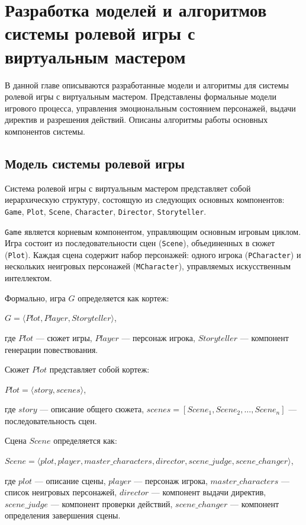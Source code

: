 \chapter{Разработка моделей и алгоритмов системы ролевой игры с виртуальным мастером}

В данной главе описываются разработанные модели и алгоритмы для системы ролевой игры с виртуальным мастером. Представлены формальные модели игрового процесса, управления эмоциональным состоянием персонажей, выдачи директив и разрешения действий. Описаны алгоритмы работы основных компонентов системы.




\section{Модель системы ролевой игры}

Система ролевой игры с виртуальным мастером представляет собой иерархическую структуру, состоящую из следующих основных компонентов: \texttt{Game}, \texttt{Plot}, \texttt{Scene}, \texttt{Character}, \texttt{Director}, \texttt{Storyteller}.

\texttt{Game} является корневым компонентом, управляющим основным игровым циклом. Игра состоит из последовательности сцен (\texttt{Scene}), объединенных в сюжет (\texttt{Plot}). Каждая сцена содержит набор персонажей: одного игрока (\texttt{PCharacter}) и нескольких неигровых персонажей (\texttt{MCharacter}), управляемых искусственным интеллектом.

Формально, игра $G$ определяется как кортеж:
\begin{center}
$G = \langle Plot, Player, Storyteller \rangle$,
\end{center}
\noindent где $Plot$ --- сюжет игры, $Player$ --- персонаж игрока, $Storyteller$ --- компонент генерации повествования.

Сюжет $Plot$ представляет собой кортеж:
\begin{center}
$Plot = \langle story, scenes \rangle$,
\end{center}
\noindent где $story$ --- описание общего сюжета, $scenes = [Scene_1, Scene_2, \ldots, Scene_n]$ --- последовательность сцен.

Сцена $Scene$ определяется как:
\begin{center}
$Scene = \langle plot, player, master\_characters, director, scene\_judge, scene\_changer \rangle$,
\end{center}
\noindent где $plot$ --- описание сцены, $player$ --- персонаж игрока, $master\_characters$ --- список неигровых персонажей, $director$ --- компонент выдачи директив, $scene\_judge$ --- компонент проверки действий, $scene\_changer$ --- компонент определения завершения сцены.

